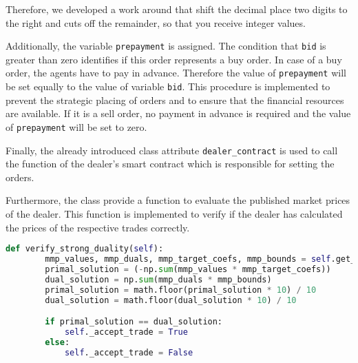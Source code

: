 Therefore, we developed a work around that shift the decimal place two digits to the right and cuts off the remainder,
so that you receive integer values. 

Additionally, the variable \verb|prepayment| is assigned. 
The condition that \verb|bid| is greater than zero identifies if this order represents a buy order.
In case of a buy order, the agents have to pay in advance.
Therefore the value of \verb|prepayment| will be set equally to the value of variable \verb|bid|. 
This procedure is implemented to prevent the strategic placing of orders and to ensure that the financial resources are available.
If it is a sell order, no payment in advance is required and the value of \verb|prepayment| will be set to zero.

Finally, the already introduced class attribute \verb|dealer_contract| is used to call the function of the dealer's smart contract which is
responsible for setting the orders.

Furthermore, the class provide a function to evaluate the published market prices of the dealer. 
This function is implemented to verify if the dealer has calculated the prices of the respective trades 
correctly.  

\begin{lstlisting}[float=htbp, label=lst:verify_trade, caption=Verification of trades, language=Python]
    def verify_strong_duality(self):
        mmp_values, mmp_duals, mmp_target_coefs, mmp_bounds = self.get_mmp_attributes()
        primal_solution = (-np.sum(mmp_values * mmp_target_coefs))
        dual_solution = np.sum(mmp_duals * mmp_bounds)
        primal_solution = math.floor(primal_solution * 10) / 10
        dual_solution = math.floor(dual_solution * 10) / 10

        if primal_solution == dual_solution:
            self._accept_trade = True
        else:
            self._accept_trade = False
\end{lstlisting}

